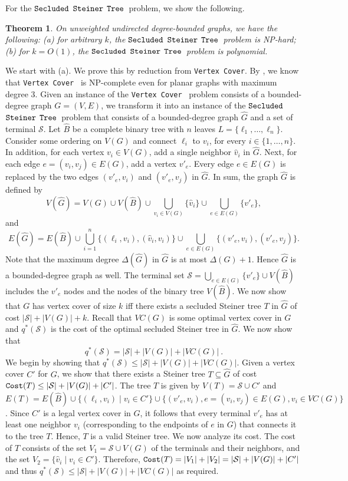 \documentclass[12pt]{article}
\newtheorem{theorem}{Theorem}[section]
\def\Cost{\mbox{\tt Cost}}
\def\Proof{\par\noindent{\bf Proof:~}}
\newcommand{\MAXDEG}[0]{\Delta}
\newcommand{\PS}[0]{$\mbox{\tt Secluded}$ $\mbox{\tt Steiner}$
$\mbox{\tt Tree}$}
\newcommand{\Terminals}[0]{\mathcal{S}}
\newcommand{\VC}[0]{\mbox{\tt Vertex Cover}}
\def\Cost{\mbox{\tt Cost}}
\begin{document}
For the \PS\ problem, we show the following.
\begin{theorem}
\label{thm:steiner_bounded_deg_poly}
On unweighted undirected degree-bounded graphs, we have the following:
(a) for arbitrary $k$, the \PS\ problem is NP-hard; (b) for $k=O(1)$, the \PS\ problem is \emph{polynomial}.
\end{theorem}
\Proof
We start with (a).
We prove this by reduction from \VC. By \cite{VCDeg3}, we know that \VC~ is NP-complete even for planar graphs with maximum degree $3$.
Given an instance of the \VC~ problem consists of a bounded-degree graph $G=(V,E)$, we transform it into an instance of  the \PS\ problem that consists of a bounded-degree graph $\widehat{G}$ and a set of terminal $\Terminals$. Let $\widehat{B}$ be a complete binary tree with $n$ leaves $L=\{\ell_1, \ldots, \ell_n\}$.
Consider some ordering on $V(G)$ and connect $\ell_i$ to $v_i$, for every $i \in \{1, \ldots, n\}$. In addition, for each vertex $v_i \in V(G)$, add a single neighbor $\widehat{v}_i$ in $\widehat{G}$. Next, for each edge $e=(v_i,v_j) \in E(G)$, add a vertex $v'_{e}$. Every edge $e \in E(G)$ is replaced by the two edges $(v'_{e},v_i)$ and $(v'_{e},v_j)$ in $\widehat{G}$. In sum, the graph $\widehat{G}$ is defined by $$V(\widehat{G})=V(G) \cup V(\widehat{B}) \cup \bigcup_{v_i\in V(G)}\{\widehat{v}_i\} \cup \bigcup_{e \in E(G)}\{v'_{e}\},$$ and  $$E(\widehat{G})=E(\widehat{B}) \cup \bigcup_{i=1}^{n} \{(\ell_i, v_i), (\widehat{v}_i, v_i)\} \cup \bigcup_{e \in E(G)}\{(v'_{e},v_i),(v'_{e},v_j)\}.$$
Note that the maximum degree $\MAXDEG(\widehat{G})$ in $\widehat{G}$ is at most $\MAXDEG(G)+1$. Hence $\widehat{G}$ is a bounded-degree graph as well.
The terminal set $\Terminals=\bigcup_{e \in E(G)}\{v'_{e}\} \cup V(\widehat{B})$ includes the $v'_{e}$ nodes and the nodes of the binary tree $V(\widehat{B})$. We now show that $G$ has vertex cover of size $k$ iff there exists a secluded Steiner tree $T$ in $\widehat{G}$ of cost $|\Terminals|+|V(G)|+k$. Recall that $VC(G)$ is some optimal vertex cover in $G$ and $q^{*}(\Terminals)$ is the cost of the optimal secluded Steiner tree in $\widehat{G}$.
We now show that
\begin{equation*}
q^{*}(\Terminals)=|\Terminals|+|V(G)|+|VC(G)|~.
\end{equation*}
We begin by showing that $q^{*}(\Terminals)\leq |\Terminals|+|V(G)|+|VC(G)|$.
Given a vertex cover $C'$ for $G$, we show that there exists a Steiner tree $T \subseteq \widehat{G}$ of cost $\Cost(T) \leq |\Terminals|+|V(G)|+|C'|$.
The tree $T$ is given by $V(T)=\Terminals \cup C'$
and $E(T)=E(\widehat{B}) \cup \{(\ell_i, v_i) \mid v_i \in C'\} \cup \{ (v'_{e},v_i), e=(v_i,v_j) \in E(G), v_i \in VC(G)\}$.
Since $C'$ is a legal vertex cover in $G$, it follows that every terminal $v'_{e}$ has at least one neighbor $v_i$ (corresponding to the endpoints of $e$ in $G$) that connects it to the tree $T$. Hence, $T$ is a valid Steiner tree. We now analyze its cost. The cost of $T$ consists of the set $V_1=\Terminals \cup V(G)$ of the terminals and their neighbors, and the set $V_2=\{\widehat{v}_i \mid v_i \in C'\}$. Therefore, $\Cost(T)=|V_1|+|V_2|=|\Terminals| + |V(G)|+|C'|$ and
thus $q^{*}(\Terminals) \leq |\Terminals| + |V(G)|+|VC(G)|$ as required.
\end{document}
